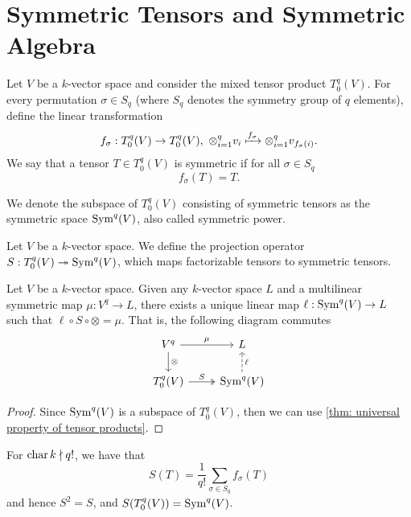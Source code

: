 \section{Symmetric Tensors and Symmetric Algebra}

\begin{definition}
  Let \(V\) be a \(k\)-vector space and consider the mixed tensor product
  \(T_0^q(V)\). For every permutation \(\sigma \in S_q\) (where
  \(S_q\) denotes the symmetry group of \(q\) elements), define the
  linear transformation
  \[
    f_\sigma: T_0^q(V) \to T_0^q(V),\ \otimes_{i=1}^q v_i \xmapsto{f_\sigma}
    \otimes_{i=1}^q v_{f_\sigma(i)}.
  \]
  We say that a tensor \(T \in T_0^q(V)\) is symmetric if for all \(\sigma \in S_q\)
  \[
     f_\sigma(T) = T.
  \]
\end{definition}

\begin{definition}
  We denote the subspace of \(T_0^q(V)\) consisting of symmetric tensors as the
  symmetric space \(\operatorname{Sym}^q(V)\), also called symmetric power.
\end{definition}

\begin{definition}
  Let \(V\) be a \(k\)-vector space. We define the projection operator \(S:
  T_0^q(V) \twoheadrightarrow \operatorname{Sym}^q(V)\), which maps factorizable tensors to symmetric tensors.
\end{definition}

\begin{proposition}
  Let \(V\) be a \(k\)-vector space. Given any \(k\)-vector space \(L\) and a
  multilinear symmetric map \(\mu: V^q \to L\), there exists a unique linear map
  \(\ell: \operatorname{Sym}^q(V) \to L\) such that \(\ell \circ S \circ \otimes = \mu\). That
  is, the following diagram commutes
  \[
    \begin{tikzcd}
      V^q \ar[r, "\mu"] \ar[d, "\otimes"] &L \\
      T_0^q(V) \ar[r, two heads, "S"] &\Sym^q(V) \ar[u, dashed, swap, "\ell"]
    \end{tikzcd}
  \]
\end{proposition}

\begin{proof}
  Since \(\operatorname{Sym}^q(V)\) is a subspace of \(T_0^q(V)\), then we can use
  \cref{thm: universal property of tensor products}.
\end{proof}

\begin{proposition}
  For \(\operatorname{char} k \nmid q!\), we have that
  \[
    S(T) = \frac{1}{q!} \sum_{\sigma \in S_q} f_\sigma(T)
  \]
  and hence \(S^2 = S\), and \(S(T_0^q(V)) = \operatorname{Sym}^q(V)\).
\end{proposition}

